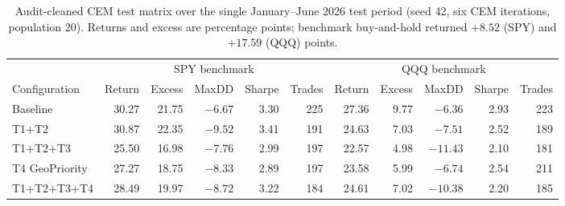 \begin{table}[t]
\caption{Audit-cleaned CEM test matrix over the single January--June 2026 test period (seed 42, six CEM iterations, population 20). Returns and excess are percentage points; benchmark buy-and-hold returned $+8.52$ (SPY) and $+17.59$ (QQQ) points.}
\label{tab:cemmatrix}
\centering
\small
\begin{tabular}{lrrrrrrrrrr}
\toprule
& \multicolumn{5}{c}{SPY benchmark} & \multicolumn{5}{c}{QQQ benchmark} \\
\cmidrule(lr){2-6}\cmidrule(lr){7-11}
Configuration & Return & Excess & MaxDD & Sharpe & Trades & Return & Excess & MaxDD & Sharpe & Trades \\
\midrule
Baseline & 30.27 & 21.75 & $-6.67$ & 3.30 & 225 & 27.36 & 9.77 & $-6.36$ & 2.93 & 223 \\
T1+T2 & 30.87 & 22.35 & $-9.52$ & 3.41 & 191 & 24.63 & 7.03 & $-7.51$ & 2.52 & 189 \\
T1+T2+T3 & 25.50 & 16.98 & $-7.76$ & 2.99 & 197 & 22.57 & 4.98 & $-11.43$ & 2.10 & 181 \\
T4 GeoPriority & 27.27 & 18.75 & $-8.33$ & 2.89 & 197 & 23.58 & 5.99 & $-6.74$ & 2.54 & 211 \\
T1+T2+T3+T4 & 28.49 & 19.97 & $-8.72$ & 3.22 & 184 & 24.61 & 7.02 & $-10.38$ & 2.20 & 185 \\
\bottomrule
\end{tabular}
\end{table}
